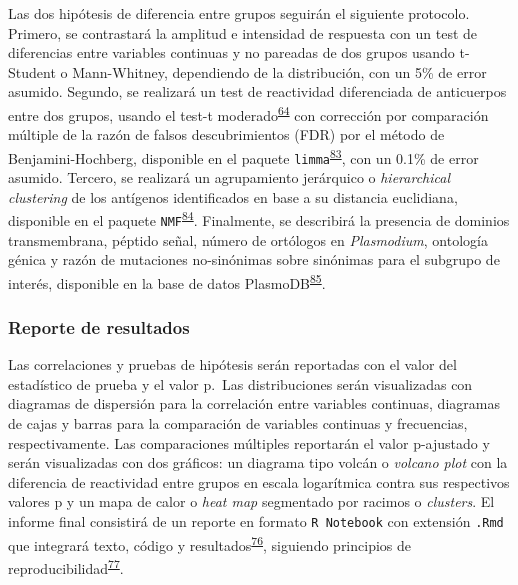 \documentclass[]{article}
\begin{document}
Las dos hipótesis de diferencia entre grupos seguirán el siguiente
protocolo. Primero, se contrastará la amplitud e intensidad de respuesta
con un test de diferencias entre variables continuas y no pareadas de
dos grupos usando t-Student o Mann-Whitney, dependiendo de la
distribución, con un 5\% de error asumido. Segundo, se realizará un test
de reactividad diferenciada de anticuerpos entre dos grupos, usando el
test-t
moderado\textsuperscript{\protect\hyperlink{ref-smyth2004ebayes}{64}}
con corrección por comparación múltiple de la razón de falsos
descubrimientos (FDR) por el método de Benjamini-Hochberg, disponible en
el paquete
\texttt{limma}\textsuperscript{\protect\hyperlink{ref-limma}{83}}, con
un 0.1\% de error asumido. Tercero, se realizará un agrupamiento
jerárquico o \emph{hierarchical clustering} de los antígenos
identificados en base a su distancia euclidiana, disponible en el
paquete
\texttt{NMF}\textsuperscript{\protect\hyperlink{ref-Gaujoux2010NMF}{84}}.
Finalmente, se describirá la presencia de dominios transmembrana,
péptido señal, número de ortólogos en \emph{Plasmodium}, ontología
génica y razón de mutaciones no-sinónimas sobre sinónimas para el
subgrupo de interés, disponible en la base de datos
PlasmoDB\textsuperscript{\protect\hyperlink{ref-plasmodb}{85}}.

\subsubsection{Reporte de resultados}\label{reporte-de-resultados}

Las correlaciones y pruebas de hipótesis serán reportadas con el valor
del estadístico de prueba y el valor p.~Las distribuciones serán
visualizadas con diagramas de dispersión para la correlación entre
variables continuas, diagramas de cajas y barras para la comparación de
variables continuas y frecuencias, respectivamente. Las comparaciones
múltiples reportarán el valor p-ajustado y serán visualizadas con dos
gráficos: un diagrama tipo volcán o \emph{volcano plot} con la
diferencia de reactividad entre grupos en escala logarítmica contra sus
respectivos valores p y un mapa de calor o \emph{heat map} segmentado
por racimos o \emph{clusters}. El informe final consistirá de un reporte
en formato \texttt{R\ Notebook} con extensión \texttt{.Rmd} que
integrará texto, código y
resultados\textsuperscript{\protect\hyperlink{ref-knitr}{76}}, siguiendo
principios de
reproducibilidad\textsuperscript{\protect\hyperlink{ref-CienciaReproducible2016}{77}}.
\end{document}
